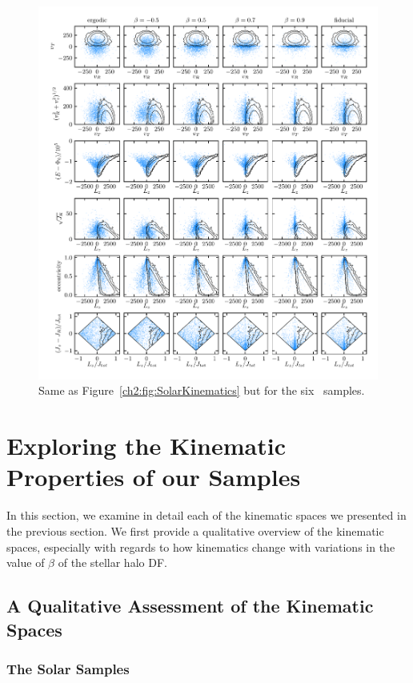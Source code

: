 \begin{figure}
	\centering
	\includegraphics[width=\textwidth]{figure/ch2/SurveyKinematicsGrid.pdf}
	\caption{Same as Figure~\ref{ch2:fig:SolarKinematics} but for the six \survey\ samples.}
	\label{ch2:fig:SurveyKinematics}
\end{figure}

\section{Exploring the Kinematic Properties of our Samples}

In this section, we examine in detail each of the kinematic spaces we presented in the previous section. We first provide a qualitative overview of the kinematic spaces, especially with regards to how kinematics change with variations in the value of $\beta$ of the stellar halo DF. 

\subsection{A Qualitative Assessment of the Kinematic Spaces}

\subsubsection{The Solar Samples}

